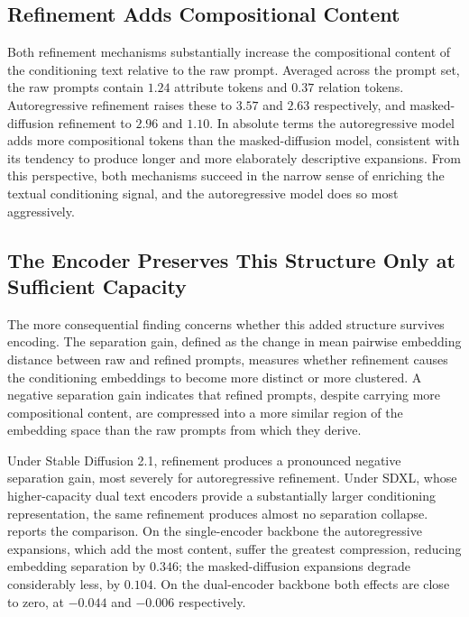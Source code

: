 \documentclass[a4paper,twoside,12pt]{report}
\begin{document}
\subsection{Refinement Adds Compositional Content}

Both refinement mechanisms substantially increase the compositional content of
the conditioning text relative to the raw prompt. Averaged across the prompt
set, the raw prompts contain \(1.24\) attribute tokens and \(0.37\) relation
tokens. Autoregressive refinement raises these to \(3.57\) and \(2.63\)
respectively, and masked-diffusion refinement to \(2.96\) and \(1.10\). In
absolute terms the autoregressive model adds more compositional tokens than the
masked-diffusion model, consistent with its tendency to produce longer and more
elaborately descriptive expansions. From this perspective, both mechanisms
succeed in the narrow sense of enriching the textual conditioning signal, and
the autoregressive model does so most aggressively.

\subsection{The Encoder Preserves This Structure Only at Sufficient Capacity}

The more consequential finding concerns whether this added structure survives
encoding. The separation gain, defined as the change in mean pairwise embedding
distance between raw and refined prompts, measures whether refinement causes the
conditioning embeddings to become more distinct or more clustered. A negative
separation gain indicates that refined prompts, despite carrying more
compositional content, are compressed into a more similar region of the
embedding space than the raw prompts from which they derive.

Under Stable Diffusion 2.1, refinement produces a pronounced negative
separation gain, most severely for autoregressive refinement. Under SDXL, whose
higher-capacity dual text encoders provide a substantially larger conditioning
representation, the same refinement produces almost no separation collapse.
 reports the comparison. On the single-encoder backbone
the autoregressive expansions, which add the most content, suffer the greatest
compression, reducing embedding separation by \(0.346\); the masked-diffusion
expansions degrade considerably less, by \(0.104\). On the dual-encoder backbone
both effects are close to zero, at \(-0.044\) and \(-0.006\) respectively.
\end{document}
